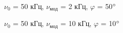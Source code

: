 \documentclass[a4paper,12pt]{article}
\begin{document}
\begin{enumerate}
\begin{figure}[h]
\begin{minipage}[h]{0.44\linewidth}
\end{minipage}
\vfill
\begin{minipage}[h]{0.44\linewidth}
 $\nu_0$ = 50 кГц, $\nu_\text{мод}$ = 2 кГц, $\varphi$ = 50$\degree$   \\
\end{minipage}
\hfill
\begin{minipage}[h]{0.44\linewidth}
 $\nu_0$ = 50 кГц, $\nu_\text{мод}$ = 10 кГц, $\varphi$ = 10$\degree$  \\
\end{minipage}
\vfill
\caption{}
\label{ris:experimentalcorrelationsignals}
\end{figure}



\end{enumerate}
\end{document}
